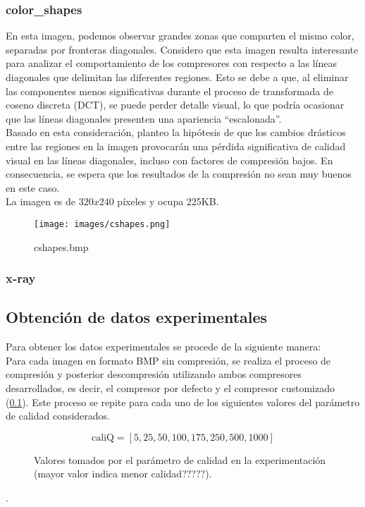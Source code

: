 \documentclass[12pt,a4paper]{article}
\begin{document}
\subsubsection{color\_shapes}
En esta imagen, podemos observar grandes zonas que comparten el mismo color, separadas por fronteras diagonales. Considero que esta imagen resulta interesante para analizar el comportamiento de los compresores con respecto a las líneas diagonales que delimitan las diferentes regiones. Esto se debe a que, al eliminar las componentes menos significativas durante el proceso de transformada de coseno discreta (DCT), se puede perder detalle visual, lo que podría ocasionar que las líneas diagonales presenten una apariencia ``escalonada''.\\

Basado en esta consideración, planteo la hipótesis de que los cambios drásticos entre las regiones en la imagen provocarán una pérdida significativa de calidad visual en las líneas diagonales, incluso con factores de compresión bajos. En consecuencia, se espera que los resultados de la compresión no sean muy buenos en este caso.\\

La imagen es de $320x240$ píxeles y ocupa 225KB.\\

\begin{figure}[H]
    \centering
    \texttt{[image: images/cshapes.png]}
    \caption{cshapes.bmp}
    
\end{figure}

\subsubsection{x-ray}

\subsection{Obtención de datos experimentales}
Para obtener los datos experimentales se procede de la siguiente manera:\\

Para cada imagen en formato BMP sin compresión, se realiza el proceso de compresión y posterior descompresión utilizando ambos compresores desarrollados, es decir, el compresor por defecto y el compresor customizado (\ref{}). Este proceso se repite para cada uno de los siguientes valores del parámetro de calidad considerados.\\
\begin{figure}[H]
    \centering
\[
\text{caliQ} = [5,25,50,100,175,250,500,1000]
\]
    \caption{Valores tomados por el parámetro de calidad en la experimentación (mayor valor indica menor calidad?????).}
    
\end{figure}
.
\end{document}
